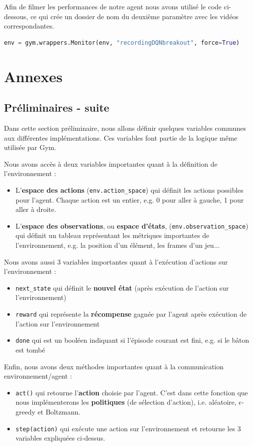\documentclass[10pt,a4paper]{article}
\begin{document}
Afin de filmer les performances de notre agent nous avons utilisé le code ci-dessous, ce qui crée un dossier de nom du deuxième paramètre avec les vidéos correspondantes.
\begin{lstlisting}[language=Python]
env = gym.wrappers.Monitor(env, "recordingDQNbreakout", force=True)
\end{lstlisting}


\section{Annexes} \label{annexes}

\subsection{Préliminaires - suite}

Dans cette section préliminaire, nous allons définir quelques variables communes aux différentes implémentations. Ces variables font partie de la logique même utilisée par Gym.

Nous avons accès à deux variables importantes quant à la définition de l'environnement :
\begin{itemize}
	\item L'\textbf{espace des actions} (\lstinline{env.action_space}) qui définit les actions possibles pour l'agent. Chaque action est un entier, e.g. 0 pour aller à gauche, 1 pour aller à droite.
	\item L'\textbf{espace des observations}, ou \textbf{espace d'états}, (\lstinline{env.observation_space}) qui définit un tableau représentant les métriques importantes de l'environnement, e.g. la position d'un élément, les frames d'un jeu...
\end{itemize}

Nous avons aussi 3 variables importantes quant à l'exécution d'actions sur l'environnement :
\begin{itemize}
	\item \lstinline{next_state} qui définit le \textbf{nouvel état} (après exécution de l'action sur l'environnement)
	\item \lstinline{reward} qui représente la \textbf{récompense} gagnée par l'agent après exécution de l'action sur l'environnement
	\item \lstinline{done} qui est un booléen indiquant si l'épisode courant est fini, e.g. si le bâton est tombé
\end{itemize}

Enfin, nous avons deux méthodes importantes quant à la communication environnement/agent :
\begin{itemize}
	\item \lstinline{act()} qui retourne l'\textbf{action} choisie par l'agent. C'est dans cette fonction que nous implémenterons les \textbf{politiques} (de sélection d'action), i.e. aléatoire, $\epsilon$-greedy et Boltzmann. 
	\item \lstinline{step(action)} qui exécute une action sur l'environnement et retourne les 3 variables expliquées ci-dessus. 
\end{itemize}
\end{document}
